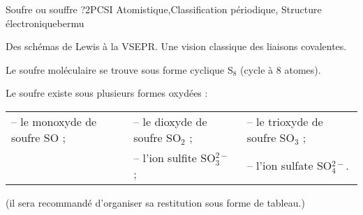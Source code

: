 
\begin{exercise}{Soufre ou souffre ?}{2}{PCSI}
{Atomistique,Classification périodique, Structure électronique}{bermu}


\begin{questions}
    \questioncours Des schémas de Lewis à la VSEPR. Une vision classique des liaisons covalentes.
    

    \question Le soufre moléculaire se trouve sous forme cyclique S$_8$ (cycle à 8 atomes).
    
    \question Le soufre existe sous plusieurs formes oxydées : \\
    \begin{tabular}{lll}
        -- le monoxyde de soufre SO ; & -- le dioxyde de soufre SO$_2$ ; & -- le trioxyde de soufre SO$_3$ ; \\
       & -- l'ion sulfite SO$_3^{2-}$ ; & -- l'ion sulfate SO$_4^{2-}$.
    \end{tabular}
    
    (il sera recommandé d'organiser sa restitution sous forme de tableau.)
\end{questions}
\end{exercise}
